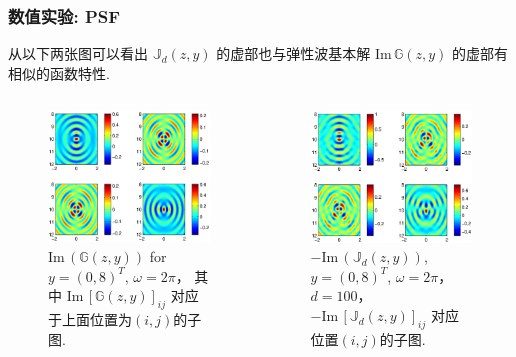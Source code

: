 \documentclass[8pt]{beamer}
\renewcommand{\Im}{\mathrm{Im}\,}
\renewcommand{\Im}{\mathrm{Im}\,}
\renewcommand{\G}{\mathbb{G}}
\newcommand{\J}{\mathbb{J}}
\begin{document}
\begin{frame}
\frametitle{数值实验: PSF}
从以下两张图可以看出 $\J_d(z,y)$ 的虚部也与弹性波基本解 $\Im\G(z,y)$ 的虚部有相似的函数特性.
\begin{columns}
	
	\begin{figure}[h]
		\centering
		\includegraphics[width=\textwidth]{./graphic/green_om_2_lm_5_mu_25_im.eps}
		\caption{$\Im(\G(z,y))$ for $y=(0,8)^T$, $\omega=2\pi$， 其中 $\Im [\G(z,y)]_{ij}$ 对应于上面位置为$(i,j)$的子图.}
	\end{figure}
	\begin{figure}[h]
		\centering
		\includegraphics[width=\textwidth]{./graphic/psf_om_2_lm_5_mu_25_im.eps}
		\caption{$-\Im(\J_d(z,y))$, $y=(0,8)^T$, $\omega=2\pi$， $d=100$， $-\Im [\J_d(z,y)]_{ij}$ 对应位置$(i,j)$的子图.}
	\end{figure}
\end{columns}
\end{frame}
\end{document}
